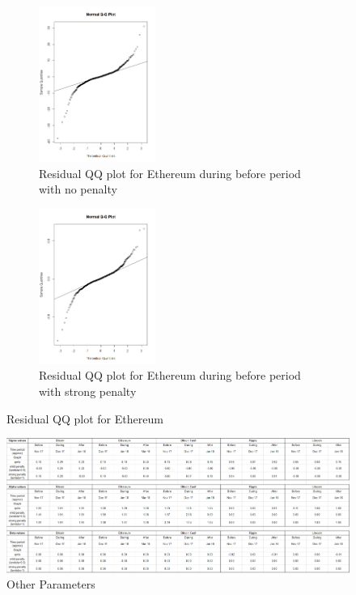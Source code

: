 \begin{spacing}{1.5}
\begin{figure}[h]
  \begin{subfigure}{.49\textwidth}
    \centering

\includegraphics[height=2in]{ethqqbefno.png}
\caption{ Residual QQ plot for Ethereum during before period with no penalty}
  \end{subfigure}
  \begin{subfigure}{.49\textwidth}
  \centering

\includegraphics[height=2in]{ethqqbefstrong.png}
\caption{ Residual QQ plot for Ethereum during before period with strong penalty
}
\end{subfigure}
\caption{Residual QQ plot for Ethereum}
\end{figure}

\begin{landscape}
\begin{figure}[h!]
  \caption{Other Parameters}
  \centering
  \includegraphics[width=1.4\textwidth]{greeks.PNG}
\end{figure}

\end{landscape}

\end{spacing}
